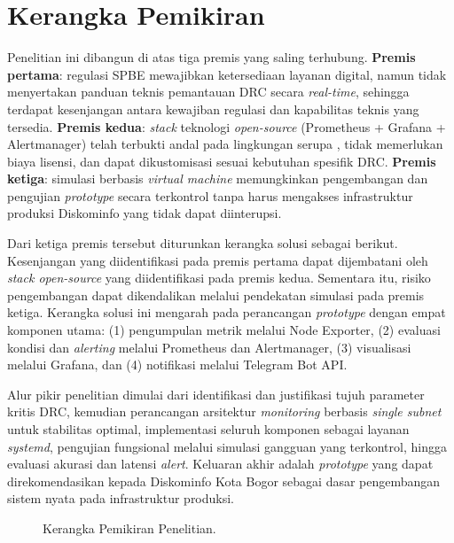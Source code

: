 \documentclass[10pt,twocolumn]{article}
\begin{document}
\section{Kerangka Pemikiran}

Penelitian ini dibangun di atas tiga premis yang saling terhubung. \textbf{Premis pertama}: regulasi
SPBE mewajibkan ketersediaan layanan digital, namun tidak menyertakan panduan teknis pemantauan DRC
secara \textit{real-time}, sehingga terdapat kesenjangan antara kewajiban regulasi dan kapabilitas
teknis yang tersedia. \textbf{Premis kedua}: \textit{stack} teknologi \textit{open-source} (Prometheus
+ Grafana + Alertmanager) telah terbukti andal pada lingkungan serupa \cite{Rahman2020,Rahayu2025},
tidak memerlukan biaya lisensi, dan dapat dikustomisasi sesuai kebutuhan spesifik DRC. \textbf{Premis
ketiga}: simulasi berbasis \textit{virtual machine} memungkinkan pengembangan dan pengujian
\textit{prototype} secara terkontrol tanpa harus mengakses infrastruktur produksi Diskominfo yang
tidak dapat diinterupsi.

Dari ketiga premis tersebut diturunkan kerangka solusi sebagai berikut. Kesenjangan yang
diidentifikasi pada premis pertama dapat dijembatani oleh \textit{stack open-source} yang
diidentifikasi pada premis kedua. Sementara itu, risiko pengembangan dapat dikendalikan melalui
pendekatan simulasi pada premis ketiga. Kerangka solusi ini mengarah pada perancangan
\textit{prototype} dengan empat komponen utama: (1) pengumpulan metrik melalui Node Exporter,
(2) evaluasi kondisi dan \textit{alerting} melalui Prometheus dan Alertmanager, (3) visualisasi
melalui Grafana, dan (4) notifikasi melalui Telegram Bot API.

Alur pikir penelitian dimulai dari identifikasi dan justifikasi tujuh parameter kritis DRC, kemudian
perancangan arsitektur \textit{monitoring} berbasis \textit{single subnet} untuk stabilitas optimal,
implementasi seluruh komponen sebagai layanan \textit{systemd}, pengujian fungsional melalui simulasi
gangguan yang terkontrol, hingga evaluasi akurasi dan latensi \textit{alert}. Keluaran akhir adalah
\textit{prototype} yang dapat direkomendasikan kepada Diskominfo Kota Bogor sebagai dasar
pengembangan sistem nyata pada infrastruktur produksi.

\begin{figure}[H]
  \centering
  \caption{Kerangka Pemikiran Penelitian.}
  \label{fig:kerangka}
\end{figure}
\end{document}

